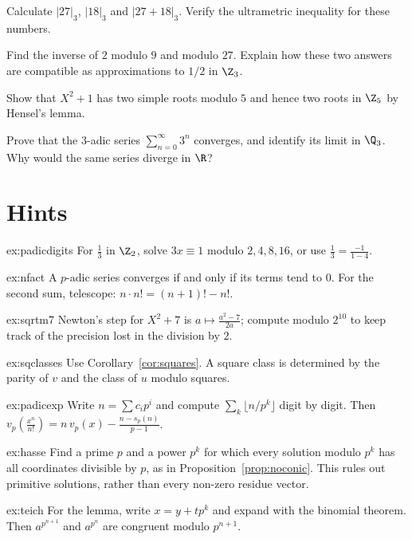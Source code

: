 \begin{exercise}[$\star$]\label{ex:v13-extra-08-1}
Calculate $|27|_3$, $|18|_3$ and $|27+18|_3$. Verify the ultrametric inequality for these numbers.
\end{exercise}

\begin{exercise}[$\star$]\label{ex:v13-extra-08-2}
Find the inverse of $2$ modulo $9$ and modulo $27$. Explain how these two answers are compatible as approximations to $1/2$ in $\Z_3$.
\end{exercise}

\begin{exercise}[$\star\star$]\label{ex:v13-extra-08-3}
Show that $X^2+1$ has two simple roots modulo $5$ and hence two roots in $\Z_5$ by Hensel's lemma.
\end{exercise}

\begin{exercise}[$\star\star\star$]\label{ex:v13-extra-08-4}
Prove that the $3$-adic series $\sum_{n=0}^{\infty}3^n$ converges, and identify its limit in $\Q_3$. Why would the same series diverge in $\R$?
\end{exercise}

\section{Hints}

\begin{hint}{ex:padicdigits}
For $\frac13$ in $\Z_2$, solve $3x\equiv1$ modulo $2,4,8,16$, or use $\frac13=\frac{-1}{1-4}$.
\end{hint}
\begin{hint}{ex:nfact}
A $p$-adic series converges if and only if its terms tend to $0$. For the second sum, telescope: $n\cdot n!=(n+1)!-n!$.
\end{hint}
\begin{hint}{ex:sqrtm7}
Newton's step for $X^2+7$ is $a\mapsto\frac{a^2-7}{2a}$; compute modulo $2^{10}$ to keep track of the precision lost in the division by $2$.
\end{hint}
\begin{hint}{ex:sqclasses}
Use Corollary~\ref{cor:squares}. A square class is determined by the parity of $v$ and the class of $u$ modulo squares.
\end{hint}
\begin{hint}{ex:padicexp}
Write $n=\sum c_ip^i$ and compute $\sum_k\lfloor n/p^k\rfloor$ digit by digit. Then $v_p\left(\frac{x^n}{n!}\right)=n\,v_p(x)-\frac{n-s_p(n)}{p-1}$.
\end{hint}
\begin{hint}{ex:hasse}
Find a prime $p$ and a power $p^k$ for which every solution modulo $p^k$ has all coordinates divisible by $p$, as in Proposition~\ref{prop:noconic}. This rules out primitive solutions, rather than every non-zero residue vector.
\end{hint}
\begin{hint}{ex:teich}
For the lemma, write $x=y+tp^k$ and expand with the binomial theorem. Then $a^{p^{n+1}}$ and $a^{p^n}$ are congruent modulo $p^{n+1}$.
\end{hint}

